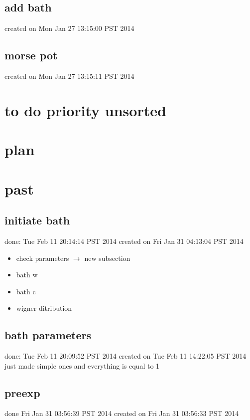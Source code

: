 \documentclass{article}
\let\Item\item
\renewcommand\item{\normalcolor\Item}
\newcommand\done{\color[RGB]{129, 180, 185} \ding{52} }
\begin{document}
\subsection{add bath}
created on Mon Jan 27 13:15:00 PST 2014
\label{sub:add_bath}

\subsection{morse pot}
created on Mon Jan 27 13:15:11 PST 2014
\label{sub:morse_pot}

\section{to do priority unsorted}
\section{plan}
\section{past} %
\subsection{initiate bath}
done: Tue Feb 11 20:14:14 PST 2014
created on Fri Jan 31 04:13:04 PST 2014
\label{sub:initiate_bath}
\begin{itemize}
  \item \done check parameters $\to$ new subsection
  \item \done bath w
  \item \done bath c
  \item \done wigner ditribution
\end{itemize}
\subsection{bath parameters}
done: Tue Feb 11 20:09:52 PST 2014
created on Tue Feb 11 14:22:05 PST 2014
\label{sub:bath_parameters}
just made simple ones and everything is equal to 1
\subsection{preexp}
done Fri Jan 31 03:56:39 PST 2014
created on Fri Jan 31 03:56:33 PST 2014
\label{sub:preexp}
\end{document}
